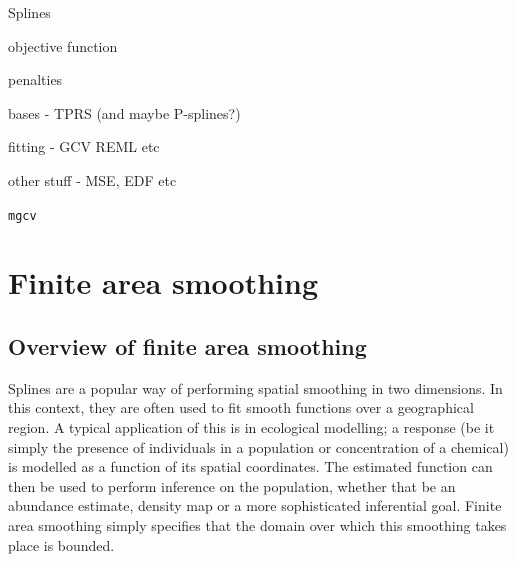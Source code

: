 \bi
\item Splines
\item objective function
\label{GAMobjfcn}
\item penalties
\label{GAMpenalties}
\item bases - TPRS (and maybe P-splines?)
\label{GAMtprspenalty}
\item fitting - GCV REML etc
\item other stuff - MSE, EDF etc
\item \texttt{mgcv}
%	
%	
%
\ei

\section{Finite area smoothing}

\subsection{Overview of finite area smoothing}

Splines are a popular way of performing spatial smoothing in two dimensions. In this context, they are often used to fit smooth functions over a geographical region. A typical application of this is in ecological modelling; a response (be it simply the presence of individuals in a population or concentration of a chemical) is modelled as a function of its spatial coordinates. The estimated function can then be used to perform inference on the population, whether that be an abundance estimate, density map or a more sophisticated inferential goal. Finite area smoothing simply specifies that the domain over which this smoothing takes place is bounded.

